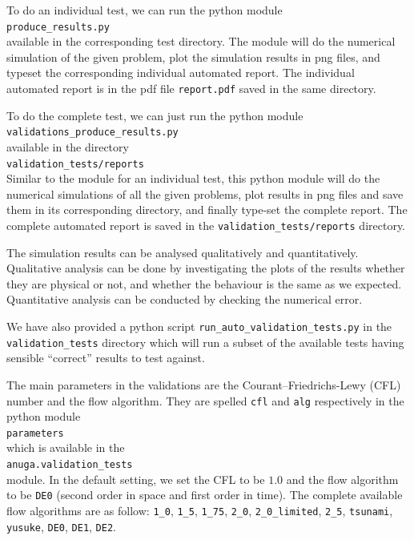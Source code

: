 \documentclass[11pt,a4paper]{report}
\begin{document}
To do an individual test, we can run the python module \\
\verb|produce_results.py| \\
available in the corresponding test directory. The module will do the
numerical simulation of the given problem, plot the simulation
results in png files, and typeset the corresponding
individual automated report. The individual automated report is in
the pdf file \verb|report.pdf| saved in the same directory.

To do the complete test, we can just run the python module \\
\verb|validations_produce_results.py| \\
available in the directory \\
\verb|validation_tests/reports| \\
Similar to the module for an individual test, this python module
will do the numerical simulations of all the given problems,
plot results in png files and save them in its corresponding directory,
and finally type-set the complete report. The complete automated report is saved in the
\verb|validation_tests/reports| directory.

The simulation results can be analysed qualitatively and quantitatively.
Qualitative analysis can be done by investigating the plots of
the results whether they are physical or not, and whether the
behaviour is the same as we expected. Quantitative analysis can
be conducted by checking the numerical error.

We have also provided a python script \verb|run_auto_validation_tests.py| in
the \verb|validation_tests| directory which will run a subset of the available tests
having sensible ``correct'' results to test against.

The main parameters in the validations are the Courant--Friedrichs-Lewy (CFL)
number and the flow algorithm. They are spelled
\verb|cfl| and \verb|alg| respectively in the python module \\
\verb|parameters| \\
which is available in the \\
\verb|anuga.validation_tests| \\
module. In the default setting, we set the CFL to be $1.0$ and
the flow algorithm to be \verb|DE0| (second order in space and first order in time).
The complete available flow algorithms are as follow:
\verb|1_0|,
\verb|1_5|,
\verb|1_75|,
\verb|2_0|,
\verb|2_0_limited|,
\verb|2_5|,
\verb|tsunami|,
\verb|yusuke|,
\verb|DE0|,
\verb|DE1|,
\verb|DE2|.
\end{document}
